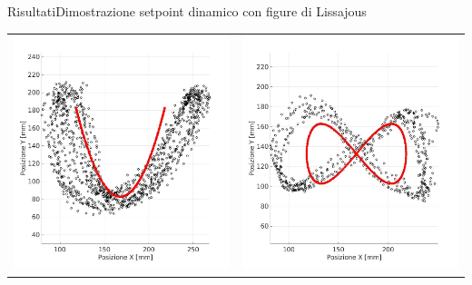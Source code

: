 \documentclass[10pt,aspectratio=169
	]{beamer}
\begin{document}
\begin{frame}{Risultati}{Dimostrazione setpoint dinamico con figure di Lissajous}
\begin{tabulary}{\linewidth}{CC}
  \includegraphics[height=0.4\textheight]{images/uc.jpg}
  &
  \hspace{1cm}
  \includegraphics[height=0.4\textheight]{images/ic.jpg}
 \end{tabulary}

	\end{frame}
	
	\begin{frame}
	\end{frame}
\end{document}
